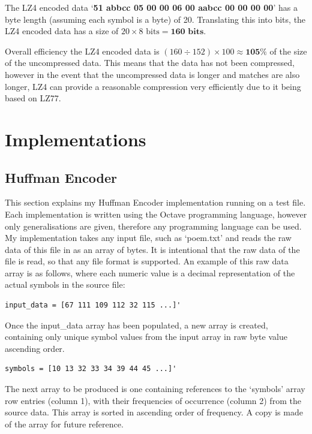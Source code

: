 \documentclass[12pt]{article}
\begin{document}
The LZ4 encoded data `\textbf{51 abbcc 05 00 00 06 00 aabcc 00 00 00 00}' has a byte length (assuming each symbol is a byte) of 20. Translating this into bits, the LZ4 encoded data has a size of $20\times8\text{ bits}=\textbf{160 bits}$.

Overall efficiency the LZ4 encoded data is $(160\div152)\times100\approx\textbf{105\%}$ of the size of the uncompressed data. This means that the data has not been compressed, however in the event that the uncompressed data is longer and matches are also longer, LZ4 can provide a reasonable compression very efficiently due to it being based on LZ77.


\clearpage
\section{Implementations}
\subsection{Huffman Encoder}{\label{sec_huff_enc}}

This section explains my Huffman Encoder implementation running on a test file. Each implementation is written using the Octave programming language, however only generalisations are given, therefore any programming language can be used. My implementation takes any input file, such as `poem.txt' and reads the raw data of this file in as an array of bytes. It is intentional that the raw data of the file is read, so that any file format is supported. An example of this raw data array is as follows, where each numeric value is a decimal representation of the actual symbols in the source file:

\begin{verbatim}
input_data = [67 111 109 112 32 115 ...]'
\end{verbatim}

Once the input\_data array has been populated, a new array is created, containing only unique symbol values from the input array in raw byte value ascending order.

\begin{verbatim}
symbols = [10 13 32 33 34 39 44 45 ...]'
\end{verbatim}

 The next array to be produced is one containing references to the `symbols' array row entries (column 1), with their frequencies of occurrence (column 2) from the source data. This array is sorted in ascending order of frequency. A copy is made of the array for future reference.
\end{document}
